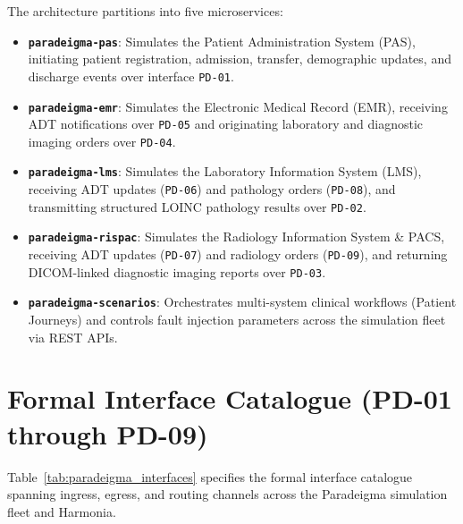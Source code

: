 The architecture partitions into five microservices:
\begin{itemize}
    \item \textbf{\texttt{paradeigma-pas}}: Simulates the Patient Administration System (PAS), initiating patient registration, admission, transfer, demographic updates, and discharge events over interface \texttt{PD-01}.
    \item \textbf{\texttt{paradeigma-emr}}: Simulates the Electronic Medical Record (EMR), receiving ADT notifications over \texttt{PD-05} and originating laboratory and diagnostic imaging orders over \texttt{PD-04}.
    \item \textbf{\texttt{paradeigma-lms}}: Simulates the Laboratory Information System (LMS), receiving ADT updates (\texttt{PD-06}) and pathology orders (\texttt{PD-08}), and transmitting structured LOINC pathology results over \texttt{PD-02}.
    \item \textbf{\texttt{paradeigma-rispac}}: Simulates the Radiology Information System \& PACS, receiving ADT updates (\texttt{PD-07}) and radiology orders (\texttt{PD-09}), and returning DICOM-linked diagnostic imaging reports over \texttt{PD-03}.
    \item \textbf{\texttt{paradeigma-scenarios}}: Orchestrates multi-system clinical workflows (Patient Journeys) and controls fault injection parameters across the simulation fleet via REST APIs.
\end{itemize}

\section{Formal Interface Catalogue (PD-01 through PD-09)}
\label{sec:paradeigma_interfaces}

Table~\ref{tab:paradeigma_interfaces} specifies the formal interface catalogue spanning ingress, egress, and routing channels across the Paradeigma simulation fleet and Harmonia.

